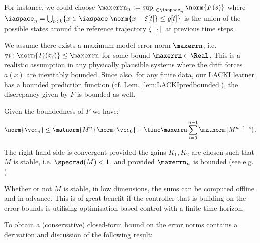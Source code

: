 For instance, we could choose $\maxerrn_n := \sup_{s \in \iaspace_n} \norm{F(s)} $
	where $\iaspace_n = \bigcup_{t< k} \{x \in \iaspace | \norm{x - \xi[t]} \leq \varrho[t] \}$ is the union of the possible states around the reference trajectory $\xi[\cdot]$ at previous time steps.
\begin{remark}	 
We assume there exists a maximum model error norm $\maxerrn$, i.e. $\forall i: \norm{F_i(x_i)} \leq \maxerrn$ for some bound $\maxerrn \in \Real$.
This is a realistic assumption in any physically plausible systems where the drift forces $a(x)$ are inevitably bounded. Since also, for any finite data, our LACKI learner has a bounded prediction function (cf. Lem. \ref{lem:LACKIpredbounded}), the discrepancy given by $F$ is bounded as well. 
\label{rem:bnd_err_innovations}
\end{remark}

Given the boundedness of $F$ we have: \vspace{-1em}
\begin{equation}
	\norm{\vc e_n} \leq   \matnorm{M^{n}} \, \norm{\vc e_0} + \tinc \maxerrn \sum_{i=0}^{n-1}  \matnorm{M^{n-1-i}}.
\end{equation}

The right-hand side is convergent provided the gains $K_1, K_2$ are chosen such that $M$ is stable, i.e. $\specrad(M) <1$, and provided $\maxerrn_n$ is bounded (see e.g. \cite{calliess2014_thesis}). 

Whether or not $M$ is stable, in low dimensions, the sums can be computed offline and in advance. This is of great benefit if 
 the controller that is building on the error bounds is utilising optimisation-based control with a finite time-horizon.   

To obtain a (conservative) closed-form bound on the error norms \cite{calliess2014_thesis}
contains a derivation and discussion of the following result:

